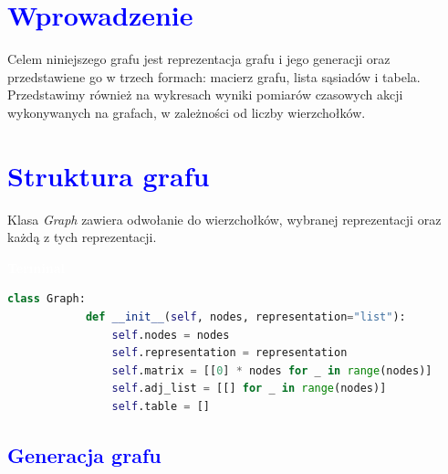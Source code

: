 \documentclass{article}
\begin{document}
	
	
	\newpage
	\titleformat{\section}{\Huge\bfseries}{\thesection}{2em}{}
	\section*{\textcolor{blue}{Wprowadzenie}}
	
	\noindent Celem niniejszego grafu jest reprezentacja grafu i jego generacji oraz przedstawiene go w trzech formach: macierz grafu, lista sąsiadów i tabela. Przedstawimy również na wykresach wyniki pomiarów czasowych akcji wykonywanych na grafach, w zależności od liczby wierzchołków. 

	\section*{\textcolor{blue}{Struktura grafu}}
	
	\begin{multicols}{2}
	\noindent Klasa \textit{Graph} zawiera odwołanie do wierzchołków, wybranej reprezentacji oraz każdą z tych reprezentacji.
	
	\begin{tcolorbox}[colback=black,colframe=gray!50!,arc=3mm,boxrule=0pt,left=0pt,right=0pt,width=\linewidth]
		\textcolor{white}{\textbf{\textsf{Terminal}}}\\
		
		\begin{lstlisting}[language=Python]
		class Graph:
			def __init__(self, nodes, representation="list"):
				self.nodes = nodes
				self.representation = representation
				self.matrix = [[0] * nodes for _ in range(nodes)]
				self.adj_list = [[] for _ in range(nodes)]
				self.table = []
		\end{lstlisting}
		
	\end{tcolorbox}
	\end{multicols}
	\subsection*{\textcolor{blue}{Generacja grafu}}
	
\end{document}
